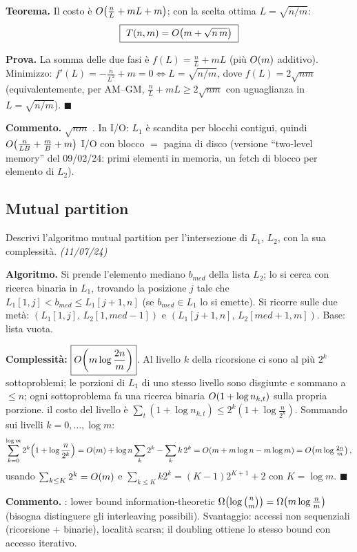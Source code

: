 \textbf{Teorema.} Il costo \`e $O\!\left(\frac{n}{L}+mL+m\right)$; con la scelta ottima $L=\sqrt{n/m}$:
\[
\boxed{\ T(n,m)=\OO{m+\sqrt{n\,m}}\ }
\]

\textbf{Prova.} La somma delle due fasi \`e $f(L)=\frac{n}{L}+mL$ (pi\`u $O\!\left(m\right)$ additivo).
Minimizzo: $f'(L)=-\frac{n}{L^2}+m=0\iff L=\sqrt{n/m}$, dove $f(L)=2\sqrt{nm}$ (equivalentemente,
per AM--GM, $\frac{n}{L}+mL\ge2\sqrt{nm}$ con uguaglianza in $L=\sqrt{n/m}$). $\blacksquare$

\textbf{Commento.} $\sqrt{nm}$ . In I/O: $L_1$ \`e scandita per blocchi contigui,
quindi $O\!\left(\frac{n}{LB}+\frac{m}{B}+m\right)$ I/O con blocco $=$ pagina di disco (versione ``two-level
memory'' del 09/02/24: primi elementi in memoria, un fetch di blocco per elemento di $L_2$).

\subsection*{ Mutual partition}

\begin{domanda}
Descrivi l'algoritmo mutual partition per l'intersezione di $L_1$, $L_2$, con la sua
complessit\`a. \emph{(11/07/24)}
\end{domanda}

\textbf{Algoritmo.} Si prende l'elemento mediano $b_{med}$ della lista  $L_2$; lo si
cerca con ricerca binaria in $L_1$, trovando la posizione $j$ tale che $L_1[1,j]<b_{med}\le
L_1[j+1,n]$ (se $b_{med}\in L_1$ lo si emette). Si ricorre sulle due met\`a:
$(L_1[1,j],\,L_2[1,med-1])$ e $(L_1[j+1,n],\,L_2[med+1,m])$. Base: lista vuota.

\textbf{Complessit\`a:} $\boxed{O\!\left(m\log\frac{2n}{m}\right)}$. Al livello $k$ della ricorsione ci sono
al pi\`u $2^k$ sottoproblemi; le porzioni di $L_1$ di uno stesso livello sono disgiunte e sommano
a $\le n$; ogni sottoproblema fa una ricerca binaria $O\!\left(1+\log n_{k,t}\right)$ sulla propria porzione.
 il costo del livello \`e
$\sum_{t}(1+\log n_{k,t})\le 2^k(1+\log\frac{n}{2^k})$. Sommando sui livelli $k=0,\dots,\log m$:
\[
\sum_{k=0}^{\log m}2^k\Bigl(1+\log\frac{n}{2^k}\Bigr)
=O\!\left(m\right)+\log n\sum_k 2^k-\sum_k k\,2^k
=O\!\left(m+m\log n-m\log m\right)=O\!\left(m\log\tfrac{2n}{m}\right),
\]
usando $\sum_{k\le K}2^k=O\!\left(m\right)$ e $\sum_{k\le K}k2^k=(K-1)2^{K+1}+2$ con $K=\log m$.
$\blacksquare$

\textbf{Commento.} : lower bound information-theoretic
$\Omega\!\left(\log\binom{n}{m}\right)=\Omega\!\left(m\log\frac{n}{m}\right)$ (bisogna distinguere gli interleaving possibili).
Svantaggio: accessi non sequenziali (ricorsione + binarie), localit\`a scarsa; il doubling
 ottiene lo stesso bound con accesso iterativo.

